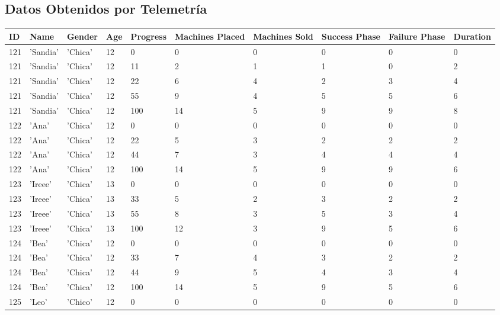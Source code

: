 \subsection{Datos Obtenidos por Telemetría}
\begin{table}[H]
  \begin{center}
  \setlength{\tabcolsep}{5pt}
  \renewcommand{\arraystretch}{1.2}
  \hspace*{-40px}
  \begin{tabular}{ @{} | m{2em} | m{4em} | m{3em} | m{2em} | m{4em} | m{4em} | m{4em} | m{3em} | m{3em} | m{4em} |  } 
  \hline
  ID & Name & Gender & Age & Progress & Machines Placed  & Machines Sold & Success Phase & Failure Phase & Duration \\
  \hline
  121  & 'Sandia' & 'Chica' &12 &0 &0 &0 &0 &0 &0  \\
  \hline
  121  & 'Sandia' & 'Chica' &12 &11 &2 &1 &1 &0 &2  \\
  \hline
  121  & 'Sandia' & 'Chica' &12 &22 &6 &4 &2 &3 &4  \\
  \hline
  121  & 'Sandia' & 'Chica' &12 &55 &9 &4 &5 &5 &6  \\
  \hline
  121  & 'Sandia' & 'Chica' &12 &100 &14 &5 &9 &9 &8  \\
  \hline
  122  & 'Ana' & 'Chica' &12 &0 &0 &0 &0 &0 &0  \\
  \hline
  122  & 'Ana' & 'Chica' &12 &22 &5 &3 &2 &2 &2  \\
  \hline
  122  & 'Ana' & 'Chica' &12 &44 &7 &3 &4 &4 &4  \\
  \hline
  122  & 'Ana' & 'Chica' &12 &100 &14 &5 &9 &9 &6  \\
  \hline
  123  & 'Ireee' & 'Chica' &13 &0 &0 &0 &0 &0 &0  \\
  \hline
  123  & 'Ireee' & 'Chica' &13 &33 &5 &2 &3 &2 &2  \\
  \hline
  123  & 'Ireee' & 'Chica' &13 &55 &8 &3 &5 &3 &4  \\
  \hline
  123  & 'Ireee' & 'Chica' &13 &100 &12 &3 &9 &5 &6  \\
  \hline
  124  & 'Bea' & 'Chica' &12 &0 &0 &0 &0 &0 &0  \\
  \hline
  124  & 'Bea' & 'Chica' &12 &33 &7 &4 &3 &2 &2  \\
  \hline
  124  & 'Bea' & 'Chica' &12 &44 &9 &5 &4 &3 &4  \\
  \hline
  124  & 'Bea' & 'Chica' &12 &100 &14 &5 &9 &5 &6  \\
  \hline
  125  & 'Leo' & 'Chico' &12 &0 &0 &0 &0 &0 &0  \\

\end{tabular}
\end{center}
\end{table}
